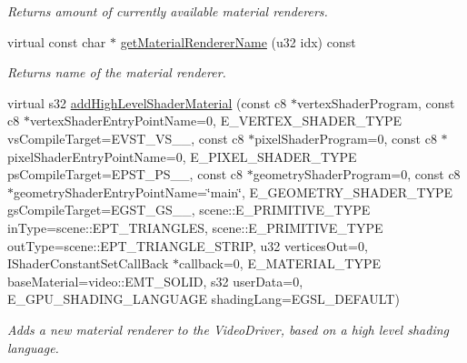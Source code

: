 \begin{DoxyCompactItemize}
\begin{DoxyCompactList}\small\item\em Returns amount of currently available material renderers. \end{DoxyCompactList}\item 
\hypertarget{classirr_1_1video_1_1_c_null_driver_a8adbb9d66d73f126bdd610957e37cbf9}{virtual const char $\ast$ \hyperlink{classirr_1_1video_1_1_c_null_driver_a8adbb9d66d73f126bdd610957e37cbf9}{get\-Material\-Renderer\-Name} (u32 idx) const }\label{classirr_1_1video_1_1_c_null_driver_a8adbb9d66d73f126bdd610957e37cbf9}

\begin{DoxyCompactList}\small\item\em Returns name of the material renderer. \end{DoxyCompactList}\item 
virtual s32 \hyperlink{classirr_1_1video_1_1_c_null_driver_a560fe93500b6be3c8aa8734e93f9688a}{add\-High\-Level\-Shader\-Material} (const c8 $\ast$vertex\-Shader\-Program, const c8 $\ast$vertex\-Shader\-Entry\-Point\-Name=0, E\-\_\-\-V\-E\-R\-T\-E\-X\-\_\-\-S\-H\-A\-D\-E\-R\-\_\-\-T\-Y\-P\-E vs\-Compile\-Target=E\-V\-S\-T\-\_\-\-V\-S\-\_\-\_, const c8 $\ast$pixel\-Shader\-Program=0, const c8 $\ast$pixel\-Shader\-Entry\-Point\-Name=0, E\-\_\-\-P\-I\-X\-E\-L\-\_\-\-S\-H\-A\-D\-E\-R\-\_\-\-T\-Y\-P\-E ps\-Compile\-Target=E\-P\-S\-T\-\_\-\-P\-S\-\_\-\_, const c8 $\ast$geometry\-Shader\-Program=0, const c8 $\ast$geometry\-Shader\-Entry\-Point\-Name=\char`\"{}main\char`\"{}, E\-\_\-\-G\-E\-O\-M\-E\-T\-R\-Y\-\_\-\-S\-H\-A\-D\-E\-R\-\_\-\-T\-Y\-P\-E gs\-Compile\-Target=E\-G\-S\-T\-\_\-\-G\-S\-\_\-\_, scene\-::\-E\-\_\-\-P\-R\-I\-M\-I\-T\-I\-V\-E\-\_\-\-T\-Y\-P\-E in\-Type=scene\-::\-E\-P\-T\-\_\-\-T\-R\-I\-A\-N\-G\-L\-E\-S, scene\-::\-E\-\_\-\-P\-R\-I\-M\-I\-T\-I\-V\-E\-\_\-\-T\-Y\-P\-E out\-Type=scene\-::\-E\-P\-T\-\_\-\-T\-R\-I\-A\-N\-G\-L\-E\-\_\-\-S\-T\-R\-I\-P, u32 vertices\-Out=0, I\-Shader\-Constant\-Set\-Call\-Back $\ast$callback=0, E\-\_\-\-M\-A\-T\-E\-R\-I\-A\-L\-\_\-\-T\-Y\-P\-E base\-Material=video\-::\-E\-M\-T\-\_\-\-S\-O\-L\-I\-D, s32 user\-Data=0, E\-\_\-\-G\-P\-U\-\_\-\-S\-H\-A\-D\-I\-N\-G\-\_\-\-L\-A\-N\-G\-U\-A\-G\-E shading\-Lang=E\-G\-S\-L\-\_\-\-D\-E\-F\-A\-U\-L\-T)
\begin{DoxyCompactList}\small\item\em Adds a new material renderer to the Video\-Driver, based on a high level shading language. \end{DoxyCompactList}\item 

\end{DoxyCompactItemize}
